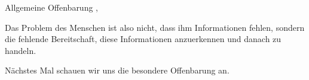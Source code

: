 \begin{otsblock}{Allgemeine Offenbarung}
     , 

    Das Problem des Menschen ist also nicht, dass ihm Informationen fehlen, sondern die fehlende Bereitschaft, diese Informationen anzuerkennen und danach zu handeln.

    Nächstes Mal schauen wir uns die besondere Offenbarung an.
\end{otsblock}
